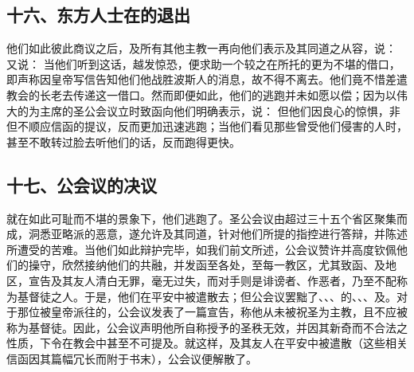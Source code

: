 
\subsection{十六、东方人士在的退出}

他们如此彼此商议之后，及所有其他主教一再向他们表示及其同道之从容，说： 又说： 当他们听到这话，越发惊恐，便求助一个较之在所托的更为不堪的借口，即声称因皇帝写信告知他们他战胜波斯人的消息，故不得不离去。他们竟不惜差遣教会的长老去传递这一借口。然而即便如此，他们的逃跑并未如愿以偿；因为以伟大的为主席的圣公会议立时致函向他们明确表示，说： 但他们因良心的惊惧，非但不顺应信函的提议，反而更加迅速逃跑；当他们看见那些曾受他们侵害的人时，甚至不敢转过脸去听他们的话，反而跑得更快。\par


\subsection{十七、公会议的决议}

就在如此可耻而不堪的景象下，他们逃跑了。圣公会议由超过三十五个省区聚集而成，洞悉亚略派的恶意，遂允许及其同道，针对他们所提的指控进行答辩，并陈述所遭受的苦难。当他们如此辩护完毕，如我们前文所述，公会议赞许并高度钦佩他们的操守，欣然接纳他们的共融，并发函至各处，至每一教区，尤其致函、及地区，宣告及其友人清白无罪，毫无过失，而对手则是诽谤者、作恶者，乃至不配称为基督徒之人。于是，他们在平安中被遣散去；但公会议罢黜了、、、的、、、及。对于那位被皇帝派往的，公会议发表了一篇宣告，称他从未被祝圣为主教，且不应被称为基督徒。因此，公会议声明他所自称授予的圣秩无效，并因其新奇而不合法之性质，下令在教会中甚至不可提及。就这样，及其友人在平安中被遣散（这些相关信函因其篇幅冗长而附于书末），公会议便解散了。\par

